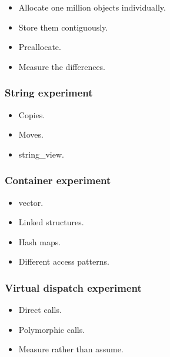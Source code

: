 \documentclass[11pt,letterpaper]{article}
\begin{document}
\begin{itemize}

\item Allocate one million objects individually.

\item Store them contiguously.

\item Preallocate.

\item Measure the differences.

\end{itemize}

\subsubsection*{String experiment}

\begin{itemize}

\item Copies.

\item Moves.

\item string\_view.

\end{itemize}

\subsubsection*{Container experiment}

\begin{itemize}

\item vector.

\item Linked structures.

\item Hash maps.

\item Different access patterns.

\end{itemize}

\subsubsection*{Virtual dispatch experiment}

\begin{itemize}

\item Direct calls.

\item Polymorphic calls.

\item Measure rather than assume.

\end{itemize}
\end{document}
